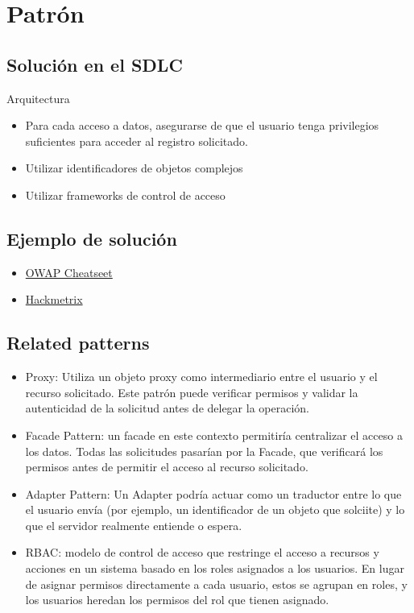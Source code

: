 \section{Patrón}
\subsection{Solución en el SDLC}
Arquitectura
\begin{itemize}
    \item Para cada acceso a datos, asegurarse de que el usuario tenga privilegios suficientes para acceder al registro solicitado.
    \item Utilizar identificadores de objetos complejos
    \item Utilizar frameworks de control de acceso
\end{itemize}
\subsection{Ejemplo de solución}
\begin{itemize}
    \item \href{https://cheatsheetseries.owasp.org/cheatsheets/Insecure_Direct_Object_Reference_Prevention_Cheat_Sheet.html}{OWAP Cheatseet}
    \item \href{https://blog.hackmetrix.com/insecure-direct-object-reference/}{Hackmetrix}
\end{itemize}

\subsection{Related patterns}
\begin{itemize}
    \item Proxy: Utiliza un objeto proxy como intermediario entre el usuario y el recurso solicitado. Este patrón puede verificar permisos y validar la autenticidad de la solicitud antes de delegar la operación.
    \item Facade Pattern: un facade en este contexto permitiría centralizar el acceso a los datos. Todas las solicitudes pasarían por la Facade, que verificará los permisos antes de permitir el acceso al recurso solicitado.
    \item Adapter Pattern: Un Adapter podría actuar como un traductor entre lo que el usuario envía (por ejemplo, un identificador de un objeto que solciite) y lo que el servidor realmente entiende o espera.
    \item RBAC: modelo de control de acceso que restringe el acceso a recursos y acciones en un sistema basado en los roles asignados a los usuarios. En lugar de asignar permisos directamente a cada usuario, estos se agrupan en roles, y los usuarios heredan los permisos del rol que tienen asignado.
\end{itemize}